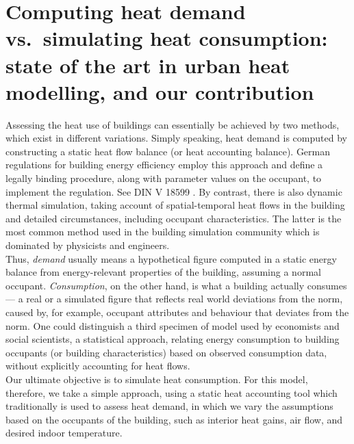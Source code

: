 \documentclass[11pt]{IJM-article}
\begin{document}
\section{Computing heat demand vs.\ simulating heat consumption: state of the
art in urban heat modelling, and our contribution }
\label{sec:4}

Assessing the heat use of buildings can essentially be achieved by two methods,
which exist in different variations. Simply speaking, heat demand is computed
by constructing a static heat flow balance (or heat accounting balance). German
regulations for building energy efficiency employ this approach and define a
legally binding procedure, along with parameter values on the occupant, to
implement the regulation. See DIN V 18599  .  By contrast,
there is also dynamic thermal simulation, taking account of spatial-temporal
heat flows in the building and detailed circumstances, including occupant
characteristics. The latter is the most common method used in the building
simulation community  which is dominated by physicists and
engineers.\\

Thus, \textit{demand} usually means a hypothetical figure computed in a static
energy balance from energy-relevant properties of the building, assuming a
normal occupant. \textit{Consumption}, on the other hand, is what a building
actually consumes --- a real or a simulated figure that reflects real world
deviations from the norm, caused by, for example, occupant attributes and
behaviour that deviates from the norm. One could distinguish a third specimen
of model used by economists and social scientists, a statistical approach,
relating energy consumption to building occupants (or building characteristics)
based on observed consumption data, without explicitly accounting for heat
flows.\\

Our ultimate objective is to simulate heat consumption. For this model,
therefore, we take a simple approach, using a static heat accounting tool which
traditionally is used to assess heat demand, in which we vary the assumptions
based on the occupants of the building, such as interior heat gains, air flow,
and desired indoor temperature.\\
\end{document}
